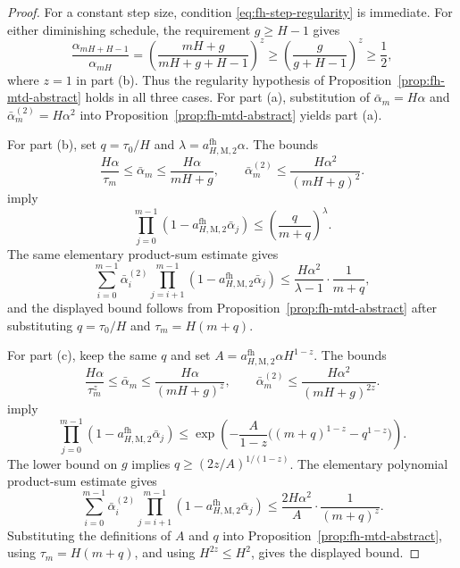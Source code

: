 \documentclass{article}
\begin{document}
\begin{proof}
For a constant step size, condition \eqref{eq:fh-step-regularity} is immediate. For either diminishing schedule, the requirement $g\ge H-1$ gives
\begin{equation}
\frac{\alpha_{mH+H-1}}{\alpha_{mH}}=\left(\frac{mH+g}{mH+g+H-1}\right)^z\ge\left(\frac{g}{g+H-1}\right)^z\ge\frac{1}{2},
\end{equation}
where $z=1$ in part \textup{(b)}. Thus the regularity hypothesis of Proposition~\ref{prop:fh-mtd-abstract} holds in all three cases. For part \textup{(a)}, substitution of $\bar\alpha_m = H\alpha$ and $\bar\alpha_m^{(2)} = H\alpha^2$ into Proposition~\ref{prop:fh-mtd-abstract} yields part \textup{(a)}.

For part \textup{(b)}, set $q=\tau_0/H$ and $\lambda=a_{H,\mathrm M,2}^{\mathrm{fh}}\alpha$. The bounds
\begin{equation}
\frac{H\alpha}{\tau_m} \le \bar\alpha_m \le \frac{H\alpha}{mH+g}, \qquad \bar\alpha_m^{(2)} \le \frac{H\alpha^2}{(mH+g)^2}.
\end{equation}
imply
\begin{equation}
\prod_{j=0}^{m-1}(1-a_{H,\mathrm M,2}^{\mathrm{fh}}\bar\alpha_j)\le \left(\frac{q}{m+q}\right)^\lambda.
\end{equation}
The same elementary product-sum estimate gives
\begin{equation}
\sum_{i=0}^{m-1}\bar\alpha_i^{(2)}\prod_{j=i+1}^{m-1}(1-a_{H,\mathrm M,2}^{\mathrm{fh}}\bar\alpha_j)\le \frac{H\alpha^2}{\lambda-1}\cdot\frac{1}{m+q},
\end{equation}
and the displayed bound follows from Proposition~\ref{prop:fh-mtd-abstract} after substituting $q=\tau_0/H$ and $\tau_m=H(m+q)$.

For part \textup{(c)}, keep the same $q$ and set $A=a_{H,\mathrm M,2}^{\mathrm{fh}}\alpha H^{1-z}$. The bounds
\begin{equation}
\frac{H\alpha}{\tau_m^z} \le \bar\alpha_m \le \frac{H\alpha}{(mH+g)^z}, \qquad \bar\alpha_m^{(2)} \le \frac{H\alpha^2}{(mH+g)^{2z}}.
\end{equation}
imply
\begin{equation}
\prod_{j=0}^{m-1}(1-a_{H,\mathrm M,2}^{\mathrm{fh}}\bar\alpha_j)\le \exp\left(-\frac{A}{1-z}\bigl((m+q)^{1-z}-q^{1-z}\bigr)\right).
\end{equation}
The lower bound on $g$ implies $q\ge (2z/A)^{1/(1-z)}$. The elementary polynomial product-sum estimate gives
\begin{equation}
\sum_{i=0}^{m-1}\bar\alpha_i^{(2)}\prod_{j=i+1}^{m-1}(1-a_{H,\mathrm M,2}^{\mathrm{fh}}\bar\alpha_j)\le \frac{2H\alpha^2}{A}\cdot\frac{1}{(m+q)^z}.
\end{equation}
Substituting the definitions of $A$ and $q$ into Proposition~\ref{prop:fh-mtd-abstract}, using $\tau_m=H(m+q)$, and using $H^{2z}\le H^2$, gives the displayed bound.
\end{proof}
\end{document}
